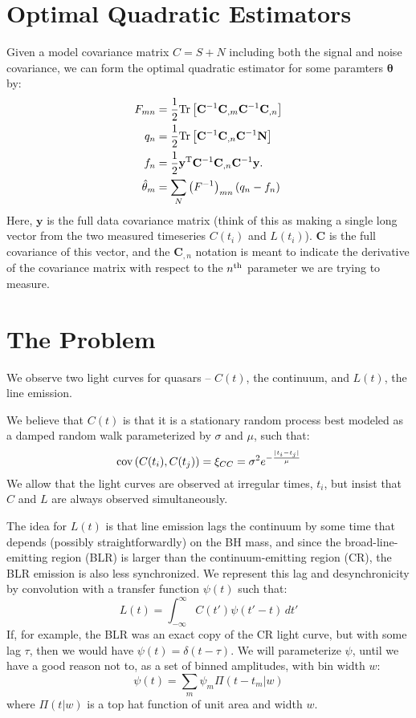 \documentclass[11pt,a4paper]{article}
\begin{document}
\section{Optimal Quadratic Estimators}
Given a model covariance matrix $C=S+N$ including both the signal and
noise covariance, we can form the optimal quadratic estimator for some
paramters $\mathbf{\theta}$ by:
\begin{align}
  F_{mn} &=\frac{1}{2}{\rm Tr}\left[\mathbf{C}^{-1}\mathbf{C}_{,m}\mathbf{C}^{-1}\mathbf{C}_{,n}\right]\nonumber \\
  q_n &=\frac{1}{2}{\rm Tr}\left[\mathbf{C}^{-1}\mathbf{C}_{,n}\mathbf{C}^{-1}\mathbf{N}\right]\nonumber \\
  f_n &=\frac{1}{2}\mathbf{y}^{\rm
    T}\mathbf{C}^{-1}\mathbf{C}_{,n}\mathbf{C}^{-1}\mathbf{y}.\nonumber \\
  \hat{\theta}_m &
  =\sum\limits_N\left(F^{-1}\right)_{mn}\left(q_n-f_n\right) \label{eqn:estimator}
\end{align}
Here, $\mathbf{y}$ is the full data covariance matrix (think of this
as making a single long vector from the two measured timeseries
$C(t_i)$ and $L(t_i)$). $\mathbf{C}$ is the full covariance of this
vector, and the $\mathbf{C}_{,n}$ notation is meant to indicate the
derivative of the covariance matrix with respect to the $n^{\rm th}$
parameter we are trying to measure.

\section{The Problem}
We observe two light curves for quasars -- $C(t)$, the continuum, and
$L(t)$, the line emission.

We believe that $C(t)$ is that it is a stationary random process best
modeled as a damped random walk parameterized by $\sigma$ and $\mu$,
such that:
\begin{equation}
  {\rm cov}\left(C(t_i),C(t_j)\right)=\xi_{CC}=\sigma^2e^{-\frac{|t_i-t_j|}{\mu}}
\end{equation}
We allow that the light curves are observed at irregular times, $t_i$,
but insist that $C$ and $L$ are always observed simultaneously.

The idea for $L(t)$ is that line emission lags the continuum by some
time that depends (possibly straightforwardly) on the BH mass, and
since the broad-line-emitting region (BLR) is larger than the
continuum-emitting region (CR), the BLR emission is also less
synchronized. We represent this lag and desynchronicity by convolution
with a transfer function $\psi(t)$ such that:
\begin{equation}
  L(t) = \int_{-\infty}^{\infty}C(t')\psi(t'-t)\, dt'
\end{equation}
If, for example, the BLR was an exact copy of the CR light curve, but
with some lag $\tau$, then we would have $\psi(t)= \delta(t-\tau)$.
We will parameterize $\psi$, until we have a good reason not to, as a
set of binned amplitudes, with bin width $w$:
\begin{equation}
  \psi(t)=\sum\limits_m \psi_m \Pi\left(t-t_m|w\right)
  \label{eqn:psiparam}
\end{equation}
where $\Pi(t|w)$ is a top hat function of unit area and width $w$.
\end{document}
